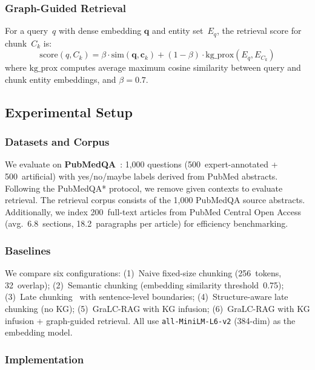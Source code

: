 \documentclass[sn-basic]{sn-jnl}
\newcommand{\gralcrag}{GraLC-RAG}
\begin{document}
\subsubsection{Graph-Guided Retrieval}\label{sec:retrieval-method}

For a query~$q$ with dense embedding $\mathbf{q}$ and entity set~$E_q$, the retrieval score for chunk~$C_k$ is:
\begin{equation}
  \text{score}(q, C_k) = \beta \cdot \text{sim}(\mathbf{q}, \mathbf{c}_k) + (1\!-\!\beta) \cdot \text{kg\_prox}(E_q, E_{C_k})
\end{equation}
where $\text{kg\_prox}$ computes average maximum cosine similarity between query and chunk entity embeddings, and $\beta\!=\!0.7$.

\subsection{Experimental Setup}\label{sec:setup}

\subsubsection{Datasets and Corpus}\label{sec:datasets}

We evaluate on \textbf{PubMedQA}~\cite{jin2019pubmedqa}: 1,000 questions (500~expert-annotated + 500~artificial) with yes/no/maybe labels derived from PubMed abstracts. Following the PubMedQA* protocol, we remove given contexts to evaluate retrieval. The retrieval corpus consists of the 1,000 PubMedQA source abstracts. Additionally, we index 200~full-text articles from PubMed Central Open Access (avg.\ 6.8~sections, 18.2~paragraphs per article) for efficiency benchmarking.

\subsubsection{Baselines}\label{sec:baselines}

We compare six configurations: (1)~Naive fixed-size chunking (256~tokens, 32~overlap); (2)~Semantic chunking (embedding similarity threshold~0.75); (3)~Late chunking~\cite{gunther2024late} with sentence-level boundaries; (4)~Structure-aware late chunking (no KG); (5)~\gralcrag{} with KG infusion; (6)~\gralcrag{} with KG infusion + graph-guided retrieval. All use \texttt{all-MiniLM-L6-v2} (384-dim) as the embedding model.

\subsubsection{Implementation}\label{sec:implementation}
\end{document}
